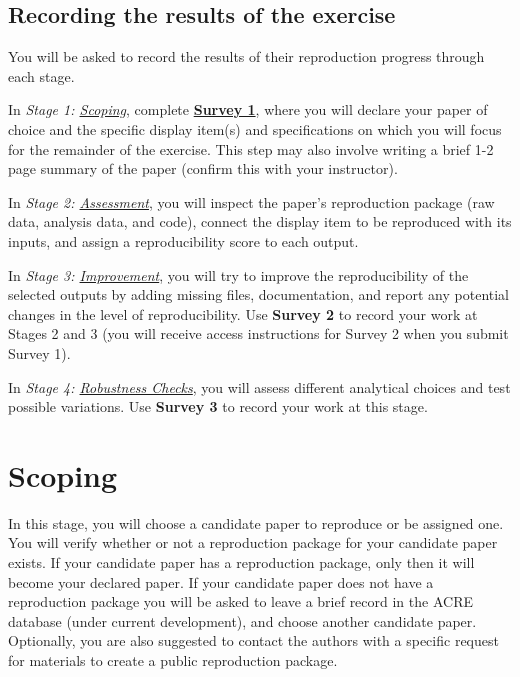 \documentclass[]{book}
\begin{document}
\hypertarget{recording-the-results-of-the-exercise}{%
\section*{Recording the results of the exercise}\label{recording-the-results-of-the-exercise}}

You will be asked to record the results of their reproduction progress through each stage.

In \emph{Stage 1: \protect\hyperlink{scoping}{Scoping}}, complete \textbf{\href{https://berkeley.qualtrics.com/jfe/form/SV_2bO83uJvU9ZiTXv}{Survey 1}}, where you will declare your paper of choice and the specific display item(s) and specifications on which you will focus for the remainder of the exercise. This step may also involve writing a brief 1-2 page summary of the paper (confirm this with your instructor).

In \emph{Stage 2: \protect\hyperlink{assessment}{Assessment}}, you will inspect the paper's reproduction package (raw data, analysis data, and code), connect the display item to be reproduced with its inputs, and assign a reproducibility score to each output.

In \emph{Stage 3: \protect\hyperlink{improvements}{Improvement}}, you will try to improve the reproducibility of the selected outputs by adding missing files, documentation, and report any potential changes in the level of reproducibility. Use \textbf{Survey 2} to record your work at Stages 2 and 3 (you will receive access instructions for Survey 2 when you submit Survey 1).

In \emph{Stage 4: \protect\hyperlink{robust}{Robustness Checks}}, you will assess different analytical choices and test possible variations. Use \textbf{Survey 3} to record your work at this stage.

\hypertarget{scoping}{%
\chapter{Scoping}\label{scoping}}

In this stage, you will choose a candidate paper to reproduce or be assigned one. You will verify whether or not a reproduction package for your candidate paper exists. If your candidate paper has a reproduction package, only then it will become your declared paper. If your candidate paper does not have a reproduction package you will be asked to leave a brief record in the ACRE database (under current development), and choose another candidate paper. Optionally, you are also suggested to contact the authors with a specific request for materials to create a public reproduction package.
\end{document}
